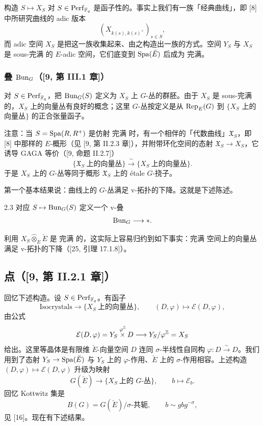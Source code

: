 构造 $S\mapsto X_S$ 对 $S\in\operatorname{Perf}_{\mathbb{F}_q}$ 是函子性的。事实上我们有一族「经典曲线」，即 [8] 中所研究曲线的 adic 版本
\[
(X_{k(s),k(s)^+})_{s\in S},
\]
而 adic 空间 $X_S$ 是把这一族收集起来、由之构造出一族的方式。空间 $Y_S$ 与 $X_S$ 是 sous-完满 的 $E$-adic 空间，它们底变到 $\operatorname{Spa}(\breve E)$ 后成为 完满。

\subsubsection{叠 $\operatorname{Bun}_G$（[9, 第 III.1 章]）}

对 $S\in\operatorname{Perf}_{\mathbb{F}_q}$，把 $\operatorname{Bun}_G(S)$ 定义为 $X_S$ 上 $G$-丛的群胚。由于 $X_S$ 是 sous-完满 的，$X_S$ 上的向量丛有良好的概念；这里 $G$-丛按定义是从 $\operatorname{Rep}_E(G)$ 到 $\{X_S$ 上的向量丛$\}$ 的正合张量函子。

注意：当 $S=\operatorname{Spa}(R,R^+)$ 是仿射 完满 时，有一个相伴的「代数曲线」$\mathfrak X_S$，即 [8] 中那样的 $E$-概形（见 [9, 第 II.2.3 章]），并附带环化空间的态射 $\mathfrak X_S\to X_S$，它诱导 GAGA 等价（[9, 命题 II.2.7]）
\[
\{\mathfrak X_S\ \text{上的向量丛}\}\xrightarrow{\ \sim\ }\{X_S\ \text{上的向量丛}\}.
\]
于是 $X_S$ 上的 $G$-丛等同于概形 $\mathfrak X_S$ 上的 étale $G$-挠子。

第一个基本结果说：曲线上的 $G$-丛满足 v-拓扑的下降。这就是下述陈述。

\begin{thm}{2.3}
对应 $S\mapsto\operatorname{Bun}_G(S)$ 定义一个 v-叠
\[
\operatorname{Bun}_G\longrightarrow *.
\]
\label{thm:a3-2-3}
\end{thm}

利用 $X_S\hat\otimes_E\breve E$ 是 完满 的，这实际上容易归约到如下事实：完满 空间上的向量丛满足 v-拓扑的下降（[25, 引理 17.1.8]）。

\subsection{点（[9, 第 II.2.1 章]）}

回忆下述构造。设 $S\in\operatorname{Perf}_{\mathbb{F}_q}$。有函子
\[
\mathrm{Isocrystals}\longrightarrow\{X_S\ \text{上的向量丛}\},\qquad (D,\varphi)\longmapsto\mathcal E(D,\varphi),
\]
由公式
\[
\mathcal E(D,\varphi)=Y_S\overset{\varphi^{\mathbb{Z}}}{\times}D\longrightarrow Y_S/\varphi^{\mathbb{Z}}=X_S
\]
给出。这里等晶体是有限维 $\breve E$-向量空间 $D$ 连同 $\sigma$-半线性自同构 $\varphi:D\xrightarrow{\sim}D$。我们用到了态射 $Y_S\to\operatorname{Spa}(\breve E)$ 与 $Y_S$ 上的 $\varphi$-作用、$\breve E$ 上的 $\sigma$-作用相容。上述构造 $(D,\varphi)\mapsto\mathcal E(D,\varphi)$ 升级为映射
\[
G(\breve E)\longrightarrow\{X_S\ \text{上的 }G\text{-丛}\},\qquad b\longmapsto\mathcal E_b.
\]
回忆 Kottwitz 集是
\[
B(G)=G(\breve E)/\sigma\text{-共轭},\qquad b\sim gbg^{-\sigma},
\]
见 [16]。现在有下述结果。

